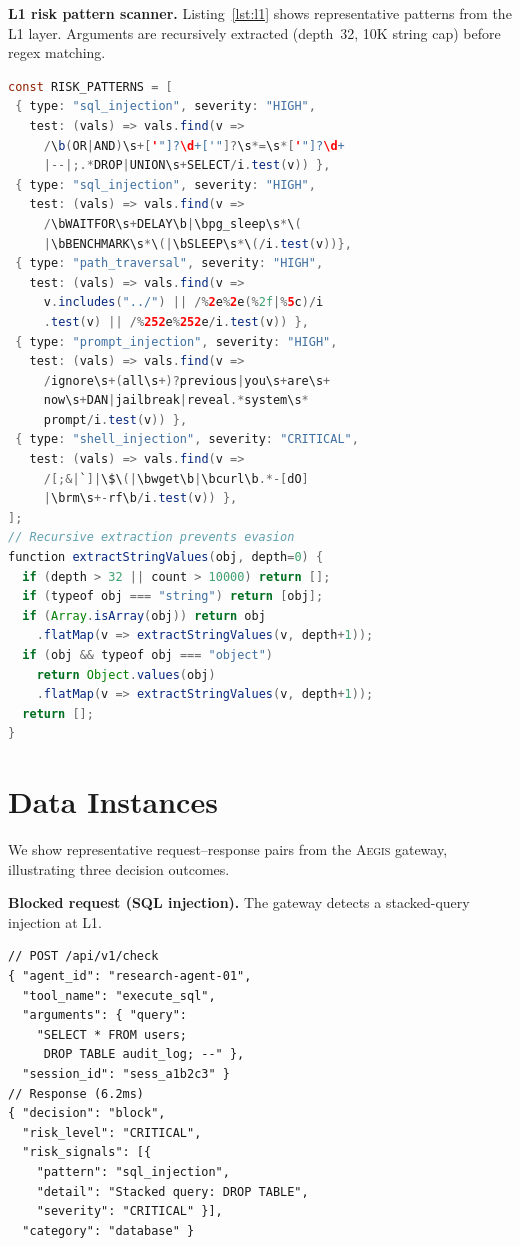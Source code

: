 \documentclass[sigconf]{acmart}
\newcommand{\system}{\textsc{Aegis}\xspace}
\begin{document}
\noindent\textbf{L1 risk pattern scanner.}
Listing~\ref{lst:l1} shows representative patterns from the L1 layer. Arguments are recursively extracted (depth~32, 10K string cap) before regex matching.

\begin{lstlisting}[caption={L1: regex-based risk scanning (excerpt).},label=lst:l1,language=Java]
const RISK_PATTERNS = [
 { type: "sql_injection", severity: "HIGH",
   test: (vals) => vals.find(v =>
     /\b(OR|AND)\s+['"]?\d+['"]?\s*=\s*['"]?\d+
     |--|;.*DROP|UNION\s+SELECT/i.test(v)) },
 { type: "sql_injection", severity: "HIGH",
   test: (vals) => vals.find(v =>
     /\bWAITFOR\s+DELAY\b|\bpg_sleep\s*\(
     |\bBENCHMARK\s*\(|\bSLEEP\s*\(/i.test(v))},
 { type: "path_traversal", severity: "HIGH",
   test: (vals) => vals.find(v =>
     v.includes("../") || /%2e%2e(%2f|%5c)/i
     .test(v) || /%252e%252e/i.test(v)) },
 { type: "prompt_injection", severity: "HIGH",
   test: (vals) => vals.find(v =>
     /ignore\s+(all\s+)?previous|you\s+are\s+
     now\s+DAN|jailbreak|reveal.*system\s*
     prompt/i.test(v)) },
 { type: "shell_injection", severity: "CRITICAL",
   test: (vals) => vals.find(v =>
     /[;&|`]|\$\(|\bwget\b|\bcurl\b.*-[dO]
     |\brm\s+-rf\b/i.test(v)) },
];
// Recursive extraction prevents evasion
function extractStringValues(obj, depth=0) {
  if (depth > 32 || count > 10000) return [];
  if (typeof obj === "string") return [obj];
  if (Array.isArray(obj)) return obj
    .flatMap(v => extractStringValues(v, depth+1));
  if (obj && typeof obj === "object")
    return Object.values(obj)
    .flatMap(v => extractStringValues(v, depth+1));
  return [];
}
\end{lstlisting}

\section{Data Instances}
\label{app:data}

We show representative request--response pairs from the \system gateway, illustrating three decision outcomes.

\noindent\textbf{Blocked request (SQL injection).}
The gateway detects a stacked-query injection at L1.

\begin{lstlisting}[caption={Gateway blocks a stacked-query SQL injection.},label=lst:block]
// POST /api/v1/check
{ "agent_id": "research-agent-01",
  "tool_name": "execute_sql",
  "arguments": { "query":
    "SELECT * FROM users;
     DROP TABLE audit_log; --" },
  "session_id": "sess_a1b2c3" }
// Response (6.2ms)
{ "decision": "block",
  "risk_level": "CRITICAL",
  "risk_signals": [{
    "pattern": "sql_injection",
    "detail": "Stacked query: DROP TABLE",
    "severity": "CRITICAL" }],
  "category": "database" }
\end{lstlisting}
\end{document}
